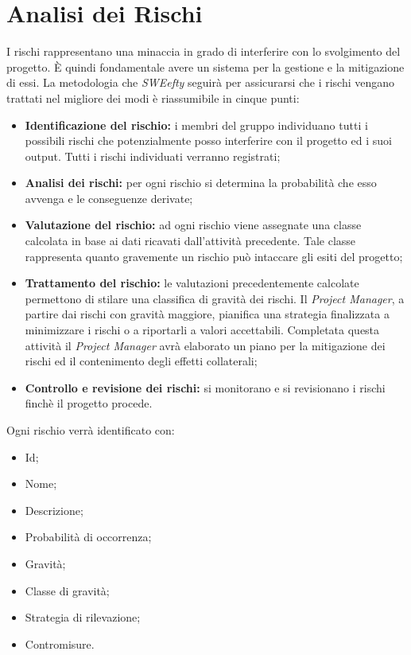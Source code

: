 \section{Analisi dei Rischi}
I rischi rappresentano una minaccia in grado di interferire con lo svolgimento del progetto. È quindi fondamentale avere un sistema per la gestione e la mitigazione di essi.
La metodologia che \textit{SWEefty} seguirà per assicurarsi che i rischi vengano trattati nel migliore dei modi è riassumibile in cinque punti:
\begin{itemize}
	\item \textbf{Identificazione del rischio:} i membri del gruppo individuano tutti i possibili rischi che potenzialmente posso interferire con il progetto ed i suoi output. Tutti i rischi individuati verranno registrati;
	
	\item \textbf{Analisi dei rischi:} per ogni rischio si determina la probabilità che esso avvenga e le conseguenze derivate;
	
	\item \textbf{Valutazione del rischio:} ad ogni rischio viene assegnate una classe calcolata in base ai dati ricavati dall'attività precedente. Tale classe rappresenta quanto gravemente un rischio può intaccare gli esiti del progetto;
	
	\item \textbf{Trattamento del rischio:} le valutazioni precedentemente calcolate permettono di stilare una classifica di gravità dei rischi. Il \emph{Project Manager}, a partire dai rischi con gravità maggiore, pianifica una strategia finalizzata a minimizzare i rischi o a riportarli a valori accettabili. Completata questa attività il \emph{Project Manager} avrà elaborato un piano per la mitigazione dei rischi ed il contenimento degli effetti collaterali;
	
	\item \textbf{Controllo e revisione dei rischi:} si monitorano e si revisionano i rischi finchè il progetto procede.
\end{itemize}

Ogni rischio verrà identificato con:
\begin{itemize}
	\item Id;
	\item Nome;
	\item Descrizione;
	\item Probabilità di occorrenza;
	\item Gravità;
	\item Classe di gravità;
	\item Strategia di rilevazione;
	\item Contromisure.
\end{itemize}

